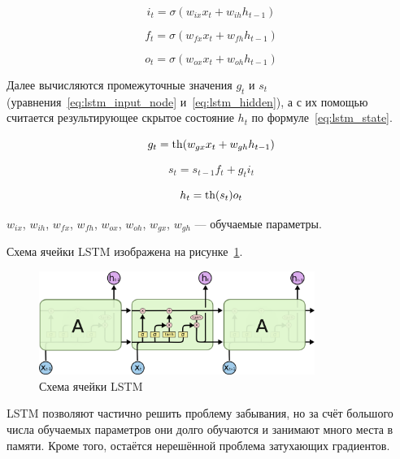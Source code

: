 \begin{equation}
    \label{eq:lstm_input}
    i_t = \sigma(w_{ix}x_t+w_{ih}h_{t-1})
\end{equation}

\begin{equation}
    \label{eq:lstm_forget}
    f_t = \sigma(w_{fx}x_t+w_{fh}h_{t-1})
\end{equation}

\begin{equation}
    \label{eq:lstm_output}
    o_t = \sigma(w_{ox}x_t+w_{oh}h_{t-1})
\end{equation}

Далее вычисляются промежуточные значения $g_t$ и $s_t$ (уравнения \ref*{eq:lstm_input_node} и \ref*{eq:lstm_hidden}), а с их помощью считается результирующее скрытое состояние $h_t$ по формуле \ref*{eq:lstm_state}.

\begin{equation}
    \label{eq:lstm_input_node}
    g_t = \operatorname{th}(w_{gx}x_t+w_{gh}h_{t-1})
\end{equation}

\begin{equation}
    \label{eq:lstm_hidden}
    s_t = s_{t-1}f_t+g_ti_t
\end{equation}

\begin{equation}
    \label{eq:lstm_state}
    h_t = \operatorname{th}(s_t)o_t
\end{equation}

$w_{ix}$, $w_{ih}$, $w_{fx}$, $w_{fh}$, $w_{ox}$, $w_{oh}$, $w_{gx}$, $w_{gh}$ --- обучаемые параметры.

Схема ячейки LSTM изображена на рисунке \ref*{fig:lstm}.

\begin{figure}[h]
    \centering
    \includegraphics[width=0.8\textwidth]{../inc/images/lstm.png}
    \caption{Схема ячейки LSTM}
    \label{fig:lstm}
\end{figure}

LSTM позволяют частично решить проблему забывания, но за счёт большого числа обучаемых параметров они долго обучаются и занимают много места в памяти. Кроме того, остаётся нерешённой проблема затухающих градиентов.

